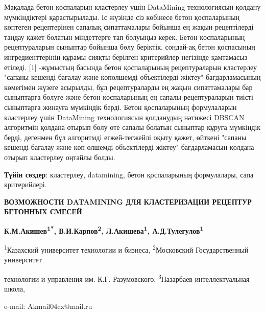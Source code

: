 Мақалада бетон қоспаларын кластерлеу үшін DataMining технологиясын
қолдану мүмкіндіктері қарастырылады. Іс жүзінде сіз көбінесе бетон
қоспаларының көптеген рецептерінен сапалық сипаттамалары бойынша ең
жақын рецептілерді таңдау қажет болатын міндеттерге тап болуыңыз керек.
Бетон қоспаларының рецептураларын сыныптар бойынша бөлу беріктік,
сондай-ақ бетон қоспасының ингредиенттерінің құрамы сияқты берілген
критерийлер негізінде қамтамасыз етіледі. {[}1{]} -жұмыстың басында
бетон қоспаларының рецептураларын кластерлеу "сапаны кешенді бағалау
және көпөлшемді объектілерді жіктеу" бағдарламасының көмегімен жүзеге
асырылды, бұл рецептураларды ең жақын сипаттамалары бар сыныптарға
бөлуге және бетон қоспаларының ең сапалы рецептураларын тиісті
сыныптарға жинауға мүмкіндік берді. Бетон қоспаларының формулаларын
кластерлеу үшін DataMining технологиясын қолданудың нәтижесі DBSCAN
алгоритмін қолдана отырып бөлу өте сапалы болатын сыныптар құруға
мүмкіндік берді, дегенмен бұл алгоритмді егжей-тегжейлі оқыту қажет,
өйткені "сапаны кешенді бағалау және көп өлшемді объектілерді жіктеу"
бағдарламасын қолдана отырып кластерлеу оңтайлы болды.

{\bfseries Түйін сөздер}: кластерлеу, datamining, бетон қоспаларының
формулалары, сапа критерийлері.

\newpage
\begin{center}
{\large\bfseries ВОЗМОЖНОСТИ DATAMINING ДЛЯ КЛАСТЕРИЗАЦИИ РЕЦЕПТУР БЕТОННЫХ
СМЕСЕЙ}

\vspace{1em}
{\bfseries К.М.Акишев\textsuperscript{1*}, В.И.Карпов\textsuperscript{2},
Л.Акишева\textsuperscript{1}, А.Д.Тулегулов\textsuperscript{1}}

\textsuperscript{1}Казахский университет технологии и бизнеса,
\textsuperscript{2}Московский Государственный университет

технологии и управления им. К.Г. Разумовского,
\textsuperscript{3}Назарбаев интеллектуальная школа,

e-mail: Akmail04cx@mail.ru
\end{center}

